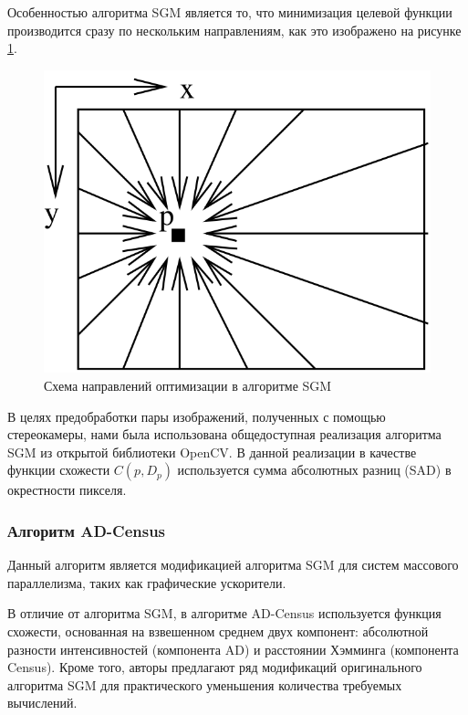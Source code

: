 \documentclass[aps,%
14pt,%
final,%
oneside,
onecolumn,%
musixtex, %
superscriptaddress,%
centertags]{extarticle} %
\begin{document}
Особенностью алгоритма SGM является то, что минимизация целевой функции производится сразу по нескольким направлениям, как это изображено на рисунке \ref{fig:sgm_paths}.

\begin{figure}[htp]
\centering
\includegraphics[scale=0.3]{sgm_paths.png}
\caption{Схема направлений оптимизации в алгоритме SGM \cite{hirschmuller2005accurate}}
\label{fig:sgm_paths}
\end{figure}

В целях предобработки пары изображений, полученных с помощью стереокамеры, нами была использована общедоступная реализация алгоритма SGM из открытой библиотеки OpenCV. В данной реализации в качестве функции схожести $C(p, D_p)$ используется сумма абсолютных разниц (SAD) в окрестности пикселя.

\subsubsection{Алгоритм AD-Census}
Данный алгоритм \cite{mei2011building} является модификацией алгоритма SGM для систем массового параллелизма, таких как графические ускорители.

В отличие от алгоритма SGM, в алгоритме AD-Census используется функция схожести, основанная на взвешенном среднем двух компонент: абсолютной разности интенсивностей (компонента AD) и расстоянии Хэмминга (компонента Census). Кроме того, авторы предлагают ряд модификаций оригинального алгоритма SGM для практического уменьшения количества требуемых вычислений.
\end{document}
